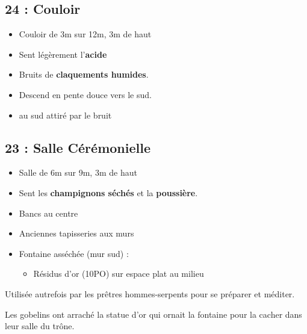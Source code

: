 \subsection{24 : Couloir}\label{n3:s24}
\begin{itemize}
  \item Couloir de 3m sur 12m, 3m de haut
  \item Sent légèrement l'\textbf{acide}
  \item Bruits de \textbf{claquements humides}.
  \item Descend en pente douce vers le sud.
  \item \textbf{} au sud attiré par le bruit
\end{itemize}

\subsection{23 : Salle Cérémonielle}\label{n3:s23}
\begin{itemize}
  \item Salle de 6m sur 9m, 3m de haut
  \item Sent les \textbf{champignons séchés} et la \textbf{poussière}.
  \item Bancs au centre
  \item Anciennes tapisseries aux murs
  \item Fontaine asséchée (mur sud) : 
  \begin{itemize}
    \item Résidus d'or (10PO) sur espace plat au milieu
  \end{itemize}
\end{itemize}

Utilisée autrefois par les prêtres hommes-serpents pour se préparer et méditer. 

Les gobelins ont arraché la statue d’or qui ornait la fontaine pour la cacher dans leur salle du trône.

